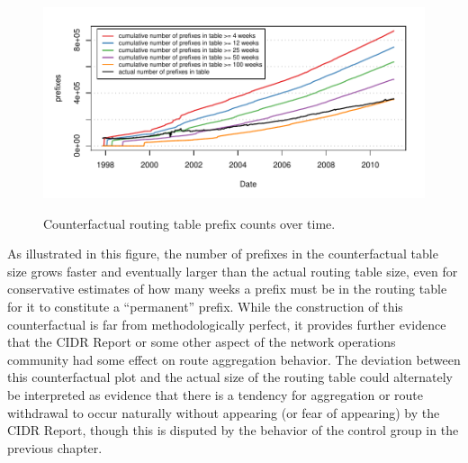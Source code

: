\begin{figure}[h]
\begin{center}
    \includegraphics[width=6in]{figures/counterfactual.pdf}
    \vspace{-2em}\\
    \caption{Counterfactual routing table prefix counts over time.}
    \label{fig:counterfactual}
\end{center}
\end{figure}

As illustrated in this figure, the number of prefixes in the counterfactual
table size grows faster and eventually larger than the actual routing table
size, even for conservative estimates of how many weeks a prefix must be in the
routing table for it to constitute a ``permanent'' prefix. While the
construction of this counterfactual is far from methodologically perfect, it
provides further evidence that the CIDR Report or some other aspect of the
network operations community had some effect on route aggregation behavior. The
deviation between this counterfactual plot and the actual size of the routing
table could alternately be interpreted as evidence that there is a tendency
for aggregation or route withdrawal to occur naturally without appearing (or
fear of appearing) by the CIDR Report, though this is disputed by the behavior
of the control group in the previous chapter.

%
%
%
%

